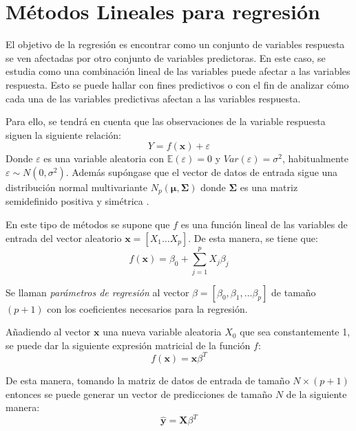 \section{Métodos Lineales para regresión}

\noindent El objetivo de la regresión es encontrar como un conjunto de variables respuesta se ven afectadas por otro conjunto de variables predictoras. En este caso, se estudia como una combinación lineal de las variables puede afectar a las variables respuesta. Esto se puede hallar con fines predictivos o con el fin de analizar cómo cada una de las variables predictivas afectan a las variables respuesta. 

\noindent Para ello, se tendrá en cuenta que las observaciones de la variable respuesta siguen la siguiente relación:
\begin{equation}
Y=f(\textbf{x})+\varepsilon
\end{equation}
\noindent Donde $\varepsilon$ es una variable aleatoria con $\mathbb{E}(\varepsilon)=0$ y $Var(\varepsilon)=\sigma^2$, habitualmente $\varepsilon \sim N(0,\sigma^2)$. Además supóngase que el vector de datos de entrada sigue una distribución normal multivariante $N_p(\mathbf{\mu},\mathbf{\Sigma})$ donde $\mathbf{\Sigma }$ es una matriz semidefinido positiva y simétrica \cite{Chatfield 1989}.


\noindent En este tipo de métodos se supone que $f$ es una función lineal de las variables de entrada del vector aleatorio $\textbf{x}=[X_1\ldots X_p]$. De esta manera, se tiene que:  
\begin{equation}
f(\textbf{x})=\beta_0+\sum_{j=1}^p X_j\beta_j
\end{equation}

\begin{defi}
Se llaman \emph{parámetros de regresión} al vector $\beta=[\beta_0, \beta_1, \ldots \beta_p]$ de tamaño $(p+1)$ con los coeficientes necesarios para la regresión. 
\end{defi} 

\noindent Añadiendo al vector $\mathbf{x}$ una nueva variable aleatoria $X_0$ que sea constantemente 1, se puede dar la siguiente expresión matricial de la función $f$:
\begin{equation}
f(\mathbf{x})= \mathbf{x}\beta^T
\end{equation}

\noindent De esta manera, tomando la matriz de datos de entrada de tamaño $N\times (p+1)$ entonces se puede generar un vector de predicciones de tamaño $N$ de la siguiente manera:
\begin{equation}
\mathbf{\hat{y}}=\mathbf{X}\beta^T  
\end{equation}  

